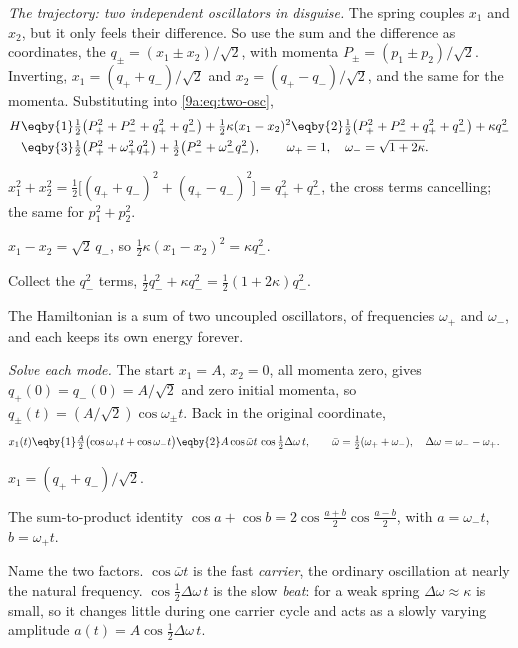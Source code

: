 \emph{The trajectory: two independent oscillators in disguise.} The spring couples $x_1$ and
$x_2$, but it only feels their difference. So use the sum and the difference as coordinates,
the  $q_\pm=(x_1\pm x_2)/\sqrt2$, with momenta $P_\pm=(p_1\pm p_2)/\sqrt2$.
Inverting, $x_1=(q_++q_-)/\sqrt2$ and $x_2=(q_+-q_-)/\sqrt2$, and the same for the momenta.
Substituting into \eqref{9a:eq:two-osc},
\begin{align}
  H&\eqby{1}\tfrac12\bigl(P_+^2+P_-^2+q_+^2+q_-^2\bigr)+\tfrac12\kappa(x_1-x_2)^2
   \eqby{2}\tfrac12\bigl(P_+^2+P_-^2+q_+^2+q_-^2\bigr)+\kappa q_-^2 \nonumber\\
   &\eqby{3}\tfrac12\bigl(P_+^2+\omega_+^2q_+^2\bigr)+\tfrac12\bigl(P_-^2+\omega_-^2q_-^2\bigr),
   \qquad \omega_+=1,\quad \omega_-=\sqrt{1+2\kappa}.
  \label{9a:eq:normal-modes}
\end{align}
\begin{explain}
  \item $x_1^2+x_2^2=\tfrac12\bigl[(q_++q_-)^2+(q_+-q_-)^2\bigr]=q_+^2+q_-^2$, the cross terms
        cancelling; the same for $p_1^2+p_2^2$.
  \item $x_1-x_2=\sqrt2\,q_-$, so $\tfrac12\kappa(x_1-x_2)^2=\kappa q_-^2$.
  \item Collect the $q_-^2$ terms, $\tfrac12q_-^2+\kappa q_-^2=\tfrac12(1+2\kappa)q_-^2$.
\end{explain}
The Hamiltonian is a sum of two uncoupled oscillators, of frequencies $\omega_+$ and
$\omega_-$, and each keeps its own energy forever.

\emph{Solve each mode.} The start $x_1=A$, $x_2=0$, all momenta zero, gives
$q_+(0)=q_-(0)=A/\sqrt2$ and zero initial momenta, so $q_\pm(t)=(A/\sqrt2)\cos\omega_\pm t$.
Back in the original coordinate,
\begin{align}
  x_1(t)&\eqby{1}\tfrac A2\bigl(\cos\omega_+t+\cos\omega_-t\bigr)
        \eqby{2}A\cos\bar\omega t\,\cos\tfrac12\Delta\omega\,t,
  \qquad \bar\omega=\tfrac12(\omega_++\omega_-),\quad \Delta\omega=\omega_--\omega_+ .
  \label{9a:eq:beat}
\end{align}
\begin{explain}
  \item $x_1=(q_++q_-)/\sqrt2$.
  \item The sum-to-product identity $\cos a+\cos b=2\cos\tfrac{a+b}2\cos\tfrac{a-b}2$, with
        $a=\omega_-t$, $b=\omega_+t$.
\end{explain}
Name the two factors. $\cos\bar\omega t$ is the fast \emph{carrier}, the ordinary oscillation
at nearly the natural frequency. $\cos\tfrac12\Delta\omega\,t$ is the slow \emph{beat}: for a
weak spring $\Delta\omega\approx\kappa$ is small, so it changes little during one carrier
cycle and acts as a slowly varying amplitude $a(t)=A\cos\tfrac12\Delta\omega\,t$.

